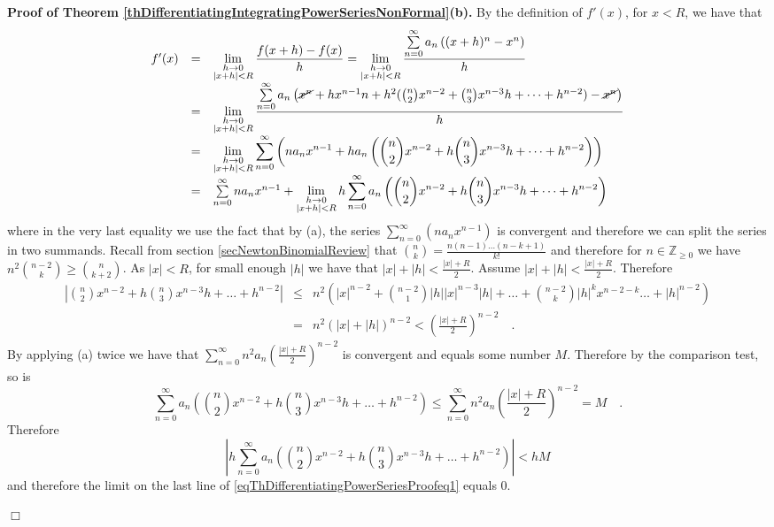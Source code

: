 \documentclass[12pt]{book}
\newenvironment{proof}[1][]{ \textbf{Proof#1.} }{$\Box$\medskip}
\begin{document}
\begin{proof}[ of Theorem \ref{thDifferentiatingIntegratingPowerSeriesNonFormal}(b)]
By the definition of $f'(x)$, for $x<R$, we have that 
\begin{equation}\label{eqThDifferentiatingPowerSeriesProofeq1}
\begin{array}{rcl}
f'(x)&=&\displaystyle\lim\limits_{\substack{h\to 0\\|x+h|<R}} \frac{f(x+h)-f(x)}{h} = \lim\limits_{\substack{h\to 0\\|x+h|<R}} \frac{\sum\limits_{n=0}^{\infty} a_n\left( (x+h)^n-x^n \right) }{h} \\
&=& \displaystyle\lim\limits_{\substack{h\to 0\\|x+h|<R}} \frac{\sum\limits_{n=0}^{\infty} a_n\left( \cancel {x^n}+ hx^{n-1}n+ h^2(\binom{n}{2} x^{n-2}+\binom{n}{3} x^{n-3}h+\dots +h^{n-2})-  \cancel{x^n}\right) }{h}
\\
&=&\displaystyle\lim\limits_{\substack{h\to 0\\|x+h|<R}} \sum\limits_{n=0}^{\infty}\left(na_n x^{n-1}  +ha_n\left(\binom{n}{2} x^{n-2}+h\binom{n}{3}x^{n-3}h+\dots +h^{n-2}\right) \right)\\
&=&\sum\limits_{n=0}^{\infty}na_n x^{n-1}  +\displaystyle\lim\limits_{\substack{h\to 0\\|x+h|<R}}h\sum\limits_{n=0}^{\infty} a_n\left(\binom{n}{2} x^{n-2}+h\binom{n}{3}x^{n-3}h+\dots +h^{n-2}\right) 
\end{array}
\end{equation}
where in the very last equality we use the fact that by (a), the series $\sum\limits_{n=0}^{\infty}\left(na_n x^{n-1}\right)$ is convergent and therefore we can split the series in two summands. Recall from section \ref{secNewtonBinomialReview} that $\binom{n }{k}= \frac{n(n-1)\dots (n-k+1)}{k!}$ and therefore for $n\in \mathbb Z_{\geq 0}$ we have $n^2\binom{n-2}{k}\geq\binom{n}{k+2}$. As $|x|<R$, for small enough $|h|$ we have that $|x|+|h|<\frac{|x|+R}{2}$. Assume $|x|+|h|<\frac{|x|+R}{2}$. Therefore 
\[\begin{array}{rcl}
\left|\binom{n}{2} x^{n-2}+h\binom{n}{3}x^{n-3}h+\dots +h^{n-2}\right|&\leq&  n^2\left( |x|^{n-2}+
\binom{n-2}{1}|h||x|^{n-3}|h|+\dots+\binom{n-2}{k}|h|^kx^{n-2-k} \dots +|h|^{n-2}\right) \\
&=&n^2 (|x|+|h|)^{n-2}<\left(\frac{|x|+R}{2}\right)^{n-2}\quad .
\end{array}
\]
By applying (a) twice we have that $\sum\limits_{n=0}^{\infty} n^2a_n\left(\frac{|x|+R}{2}\right)^{n-2} $ is convergent and equals some number $M$. Therefore by the comparison test, so is 
\[
\sum\limits_{n=0}^{\infty} a_n\left(\binom{n}{2} x^{n-2}+h\binom{n}{3}x^{n-3}h+\dots +h^{n-2}\right)\leq \sum\limits_{n=0}^{\infty} n^2a_n\left(\frac{|x|+R}{2}\right)^{n-2}=M\quad .
\] Therefore 
\[
\left|h\sum\limits_{n=0}^{\infty} a_n\left(\binom{n}{2} x^{n-2}+h\binom{n}{3}x^{n-3}h+\dots +h^{n-2}\right)\right|< h M
\] and therefore the limit on the last line of \eqref{eqThDifferentiatingPowerSeriesProofeq1} equals 0.


\end{proof}
\end{document}
